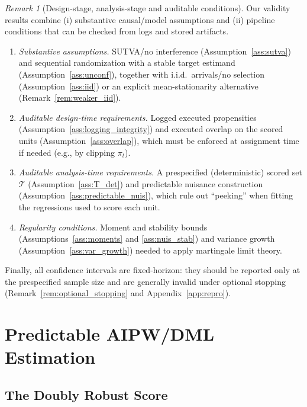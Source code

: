 \documentclass[11pt]{article}
\numberwithin{equation}{section}
\theoremstyle{plain}
\theoremstyle{definition}
\theoremstyle{remark}
\newtheorem{remark}[theorem]{Remark}
\begin{document}
\begin{remark}[Design-stage, analysis-stage and auditable conditions]\label{rem:assumptions}
Our validity results combine (i) substantive causal/model assumptions and (ii) pipeline conditions that can be checked from logs and stored artifacts.
\begin{enumerate}
\item \emph{Substantive assumptions.} SUTVA/no interference (Assumption~\ref{ass:sutva}) and sequential randomization with a stable target estimand (Assumption~\ref{ass:unconf}), together with i.i.d.\ arrivals/no selection (Assumption~\ref{ass:iid}) or an explicit mean-stationarity alternative (Remark~\ref{rem:weaker_iid}).
\item \emph{Auditable design-time requirements.} Logged executed propensities (Assumption~\ref{ass:logging_integrity}) and executed overlap on the scored units (Assumption~\ref{ass:overlap}), which must be enforced at assignment time if needed (e.g., by clipping $\pi_t$).
\item \emph{Auditable analysis-time requirements.} A prespecified (deterministic) scored set $\mathcal{T}$ (Assumption~\ref{ass:T_det}) and predictable nuisance construction (Assumption~\ref{ass:predictable_nuis}), which rule out ``peeking'' when fitting the regressions used to score each unit.
\item \emph{Regularity conditions.} Moment and stability bounds (Assumptions~\ref{ass:moments} and \ref{ass:nuis_stab}) and variance growth (Assumption~\ref{ass:var_growth}) needed to apply martingale limit theory.
\end{enumerate}
Finally, all confidence intervals are fixed-horizon: they should be reported only at the prespecified sample size and are generally invalid under optional stopping (Remark~\ref{rem:optional_stopping} and Appendix~\ref{app:repro}).
\end{remark}


\section{Predictable AIPW/DML Estimation}\label{sec:estimation}

\subsection{The Doubly Robust Score}\label{sec:drscore}
\end{document}
